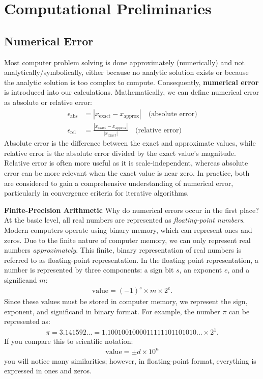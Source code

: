 \section{Computational Preliminaries}
\subsection{Numerical Error}
Most computer problem solving is done approximately (numerically) and not analytically/symbolically, either because no analytic solution exists or because the analytic solution is too complex to compute. Consequently, \textbf{numerical error} is introduced into our calculations. Mathematically, we can define numerical error as absolute or relative error:
\begin{align*}
    \epsilon_{\text{abs}} &= |x_{\text{exact}} - x_{\text{approx}}| \quad \text{(absolute error)} \\
    \epsilon_{\text{rel}} &= \frac{|x_{\text{exact}} - x_{\text{approx}}|}{|x_{\text{exact}}|} \quad \text{(relative error)}
\end{align*}
Absolute error is the difference between the exact and approximate values, while relative error is the absolute error divided by the exact value's magnitude.
Relative error is often more useful as it is scale-independent, whereas absolute error can be more relevant when the exact value is near zero.
In practice, both are considered to gain a comprehensive understanding of numerical error, particularly in convergence criteria for iterative algorithms.



\textbf{Finite-Precision Arithmetic}\quad
Why do numerical errors occur in the first place? At the basic level, all real numbers are represented as \emph{floating-point numbers}. Modern computers operate using binary memory, which can represent ones and zeros. Due to the finite nature of computer memory, we can only represent real numbers \emph{approximately}. This finite, binary representation of real numbers is referred to as floating-point representation. 
In the floating point representation, a number is represented by three components: a sign bit $s$, an exponent $e$, and a significand $m$:
\begin{align*}
\text{value} = (-1)^s \times m \times 2^e.
\end{align*}
Since these values must be stored in computer memory, we represent the sign, exponent, and significand in binary format. For example, the number $\pi$ can be represented as:
\begin{align*}
  \pi = 3.141592... = 1.1001001000011111101101010... \times 2^1.
\end{align*}
If you compare this to scientific notation:
\begin{align*}
  \text{value} = \pm d \times 10^n \tag{scientific notation}
\end{align*}
you will notice many similarities; however, in floating-point format, everything is expressed in ones and zeros.


